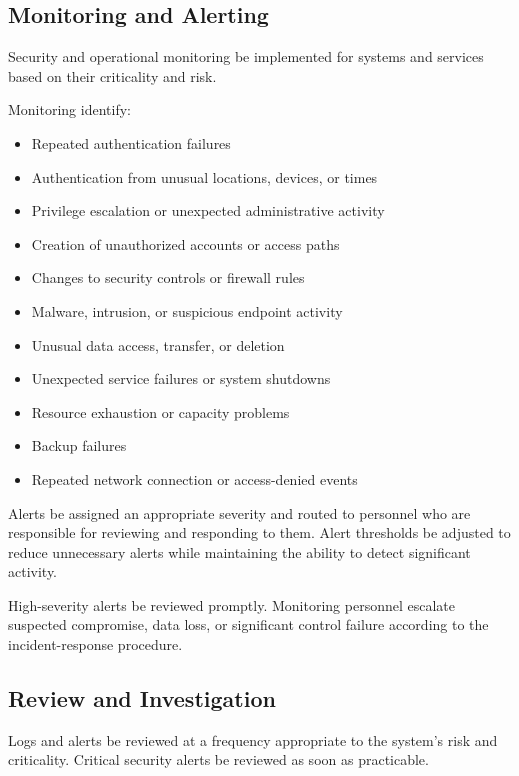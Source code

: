 \subsection{Monitoring and Alerting}

Security and operational monitoring \must{} be implemented for systems and services based on their criticality and risk.

Monitoring \should{} identify:
\begin{itemize}
    \item Repeated authentication failures
    \item Authentication from unusual locations, devices, or times
    \item Privilege escalation or unexpected administrative activity
    \item Creation of unauthorized accounts or access paths
    \item Changes to security controls or firewall rules
    \item Malware, intrusion, or suspicious endpoint activity
    \item Unusual data access, transfer, or deletion
    \item Unexpected service failures or system shutdowns
    \item Resource exhaustion or capacity problems
    \item Backup failures
    \item Repeated network connection or access-denied events
\end{itemize}

Alerts \must{} be assigned an appropriate severity and routed to personnel who are responsible for reviewing and responding to them. Alert thresholds \should{} be adjusted to reduce unnecessary alerts while maintaining the ability to detect significant activity.

High-severity alerts \must{} be reviewed promptly. Monitoring personnel \must{} escalate suspected compromise, data loss, or significant control failure according to the incident-response procedure.

\subsection{Review and Investigation}

Logs and alerts \must{} be reviewed at a frequency appropriate to the system's risk and criticality. Critical security alerts \should{} be reviewed as soon as practicable.

